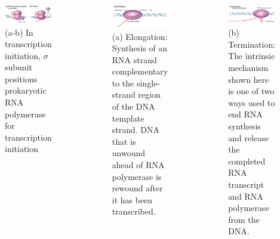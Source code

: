 \documentclass[11pt,ignorenonframetext,aspectratio=169]{beamer}
\begin{document}
\begin{frame}{}
\protect\hypertarget{section-18}{}

\begin{columns}[T,onlytextwidth]


\begin{figure}
\includegraphics[width=0.8\linewidth]{../images/gene_transcription_prokaryotes1} \caption{(a-b) In transcription initiation, $\sigma$ subunit positions prokaryotic RNA polymerase for transcription initiation}\label{fig:gene-transcription-prokaryotes1}
\end{figure}

  
\begin{figure}
\includegraphics[width=0.75\linewidth]{../images/gene_transcription_prokaryotes2} \caption{(a) Elongation: Synthesis of an RNA strand complementary to the single-strand region of the DNA template strand. DNA that is unwound ahead of RNA polymerase is rewound after it has been transcribed.}\label{fig:gene-transcription-prokaryotes2}
\end{figure}


\begin{figure}
\includegraphics[width=0.75\linewidth]{../images/gene_transcription_prokaryotes3} \caption{(b) Termination: The intrinsic mechanism shown here is one of two ways used to end RNA synthesis and release the completed RNA transcript and RNA polymerase from the DNA.}\label{fig:gene-transcription-prokaryotes3}
\end{figure}

\end{columns}

\end{frame}
\end{document}
